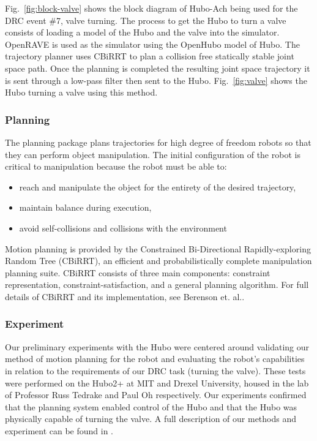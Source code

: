 Fig.~\ref{fig:block-valve} shows the block diagram of Hubo-Ach being used for the DRC event \#7, valve turning.  
The process to get the Hubo to turn a valve consists of loading a model of the Hubo and the valve into the simulator.  
OpenRAVE is used as the simulator using the OpenHubo model of Hubo.  
The trajectory planner uses CBiRRT to plan a collision free statically stable joint space path.  
Once the planning is completed the resulting joint space trajectory it is sent through a low-pass filter then sent to the Hubo.
Fig.~\ref{fig:valve} shows the Hubo turning a valve using this method.








\subsubsection{Planning}
The planning package plans trajectories for high degree of freedom robots so that they can perform object manipulation.
The initial configuration of the robot is critical to manipulation because the robot must be able to:
\begin{itemize}
\item reach and manipulate the object for the entirety of the desired trajectory,
\item maintain balance during execution,
\item avoid self-collisions and collisions with the environment
\end{itemize}
Motion planning is provided by the Constrained Bi-Directional Rapidly-exploring Random Tree (CBiRRT), an efficient and probabilistically complete manipulation planning suite. 
CBiRRT consists of three main components: constraint
representation, constraint-satisfaction, and a general planning algorithm. 
For full details of CBiRRT and its implementation, see Berenson et. al.\cite{Berenson_2011_6867}.

\subsubsection{Experiment}
Our preliminary experiments with the Hubo were centered around validating our method of motion planning for the robot and evaluating the robot’s capabilities in relation to the requirements of our DRC task (turning the valve). 
These tests were performed on the Hubo2+ at MIT and Drexel University, housed in the lab of Professor Russ Tedrake and Paul Oh respectively.
Our experiments conﬁrmed that the planning system enabled control of the Hubo and that the Hubo was physically capable of turning the valve.
A full description of our methods and experiment can be found in \cite{lofaroTePRA2013Valve}.









